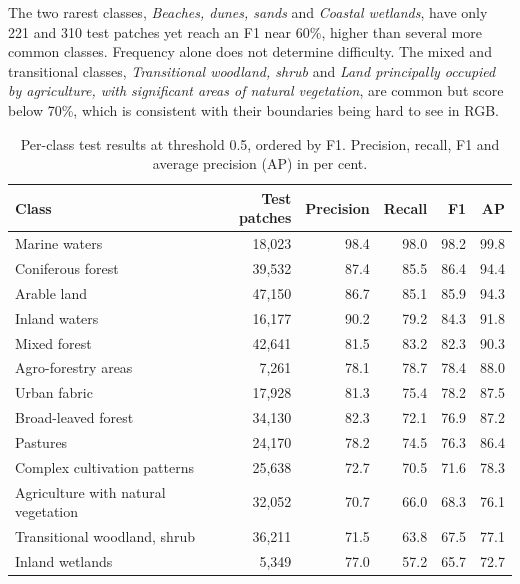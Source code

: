 \documentclass[11pt]{article}
\begin{document}
The two rarest classes, \emph{Beaches, dunes, sands} and \emph{Coastal wetlands}, have only 221 and 310
test patches yet reach an F1 near 60\%, higher than several more common classes. Frequency alone does
not determine difficulty. The mixed and transitional classes, \emph{Transitional woodland, shrub} and
\emph{Land principally occupied by agriculture, with significant areas of natural vegetation}, are common
but score below 70\%, which is consistent with their boundaries being hard to see in RGB.

\begin{table}[!htbp]
\centering
\caption{Per-class test results at threshold 0.5, ordered by F1. Precision, recall, F1 and average
precision (AP) in per cent.}
\label{tab:perclass}
\small
\begin{tabular}{lrrrrr}
\toprule
Class & Test patches & Precision & Recall & F1 & AP \\
\midrule
Marine waters                                   & 18,023 & 98.4 & 98.0 & 98.2 & 99.8 \\
Coniferous forest                               & 39,532 & 87.4 & 85.5 & 86.4 & 94.4 \\
Arable land                                     & 47,150 & 86.7 & 85.1 & 85.9 & 94.3 \\
Inland waters                                   & 16,177 & 90.2 & 79.2 & 84.3 & 91.8 \\
Mixed forest                                    & 42,641 & 81.5 & 83.2 & 82.3 & 90.3 \\
Agro-forestry areas                             &  7,261 & 78.1 & 78.7 & 78.4 & 88.0 \\
Urban fabric                                    & 17,928 & 81.3 & 75.4 & 78.2 & 87.5 \\
Broad-leaved forest                             & 34,130 & 82.3 & 72.1 & 76.9 & 87.2 \\
Pastures                                        & 24,170 & 78.2 & 74.5 & 76.3 & 86.4 \\
Complex cultivation patterns                    & 25,638 & 72.7 & 70.5 & 71.6 & 78.3 \\
Agriculture with natural vegetation             & 32,052 & 70.7 & 66.0 & 68.3 & 76.1 \\
Transitional woodland, shrub                    & 36,211 & 71.5 & 63.8 & 67.5 & 77.1 \\
Inland wetlands                                 &  5,349 & 77.0 & 57.2 & 65.7 & 72.7 \\

\end{tabular}
\end{table}
\end{document}
